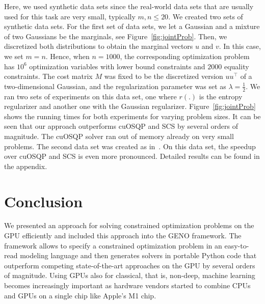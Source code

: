 \documentclass[letterpaper]{article} %
\begin{document}
Here, we used synthetic data sets since the real-world data sets that are usually used for this task are very small, typically $m, n \leq 20$. We created two sets of synthetic data sets. For the first set of data sets, we let a Gaussian and a mixture of two Gaussians be the marginals, see Figure~\ref{fig:jointProb}. Then, we discretized both distributions to obtain the marginal vectors $u$ and $v$. In this case, we set $m=n$. Hence, when $n=1000$, the corresponding optimization problem has $10^6$ optimization variables with lower bound constraints and $2000$ equality constraints. The cost matrix $M$ was fixed to be the discretized version $uu^\top$ of a two-dimensional Gaussian, and the regularization parameter was set as $\lambda=\frac{1}{2}$. We ran two sets of experiments on this data set, one where $r(.)$ is the entropy regularizer and another one with the Gaussian regularizer. Figure~\ref{fig:jointProb} shows the running times for both experiments for varying problem sizes. It can be seen that our approach outperforms cuOSQP and SCS by several orders of magnitude. The cuOSQP solver ran out of memory already on very small problems. The second data set was created as in~\cite{FrognerP19}. On this data set, the speedup over cuOSQP and SCS is even more pronounced. Detailed results can be found in the appendix. 
 
\section{Conclusion}
We presented an approach for solving constrained optimization problems on the GPU efficiently and included this approach into the GENO framework.
The framework allows to specify a constrained optimization problem in an easy-to-read modeling language  and then generates solvers in portable Python code that outperform competing state-of-the-art approaches on the GPU by several orders of magnitude. Using GPUs also for classical, that is, non-deep, machine learning becomes increasingly important as hardware vendors %
started to combine CPUs and GPUs on a single chip like Apple's M1 chip. 

\end{document}
